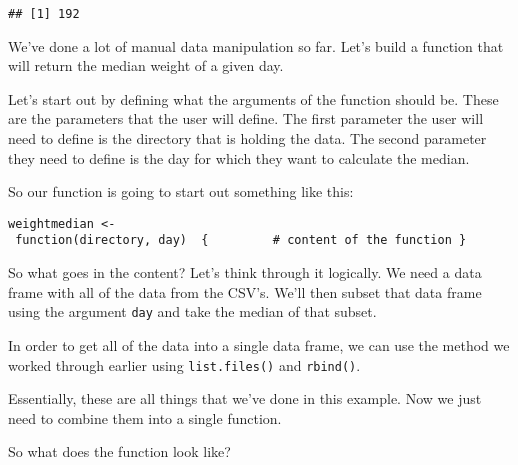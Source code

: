 \documentclass[
]{article}
\newenvironment{Shaded}{\begin{snugshade}}{\end{snugshade}}
\newcommand{\DecValTok}[1]{\textcolor[rgb]{0.00,0.00,0.81}{#1}}
\newcommand{\KeywordTok}[1]{\textcolor[rgb]{0.13,0.29,0.53}{\textbf{#1}}}
\newcommand{\NormalTok}[1]{#1}
\newcommand{\OperatorTok}[1]{\textcolor[rgb]{0.81,0.36,0.00}{\textbf{#1}}}
\begin{document}
\begin{Shaded}
\end{Shaded}

\begin{verbatim}
## [1] 192
\end{verbatim}

We've done a lot of manual data manipulation so far. Let's build a
function that will return the median weight of a given day.

Let's start out by defining what the arguments of the function should
be. These are the parameters that the user will define. The first
parameter the user will need to define is the directory that is holding
the data. The second parameter they need to define is the day for which
they want to calculate the median.

So our function is going to start out something like this:

\texttt{weightmedian\ \textless{}-\ function(directory,\ day)\ \ \{\ \ \ \ \ \ \ \ \ \#\ content\ of\ the\ function\ \}}

So what goes in the content? Let's think through it logically. We need a
data frame with all of the data from the CSV's. We'll then subset that
data frame using the argument \texttt{day} and take the median of that
subset.

In order to get all of the data into a single data frame, we can use the
method we worked through earlier using \texttt{list.files()} and
\texttt{rbind()}.

Essentially, these are all things that we've done in this example. Now
we just need to combine them into a single function.

So what does the function look like?
\end{document}
